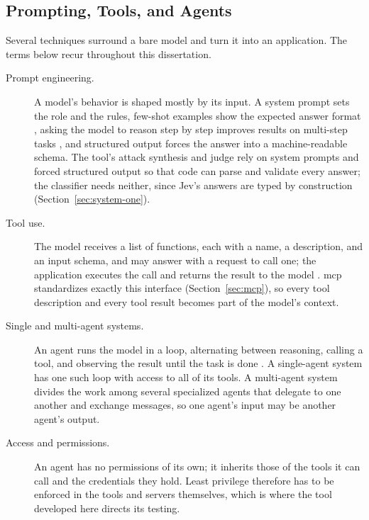 \subsection{Prompting, Tools, and Agents}
\label{sec:llm-ecosystem}

Several techniques surround a bare model and turn it into an application. The terms below recur throughout this dissertation.

\begin{description}
  \item[Prompt engineering.] A model's behavior is shaped mostly by its input. A system prompt sets the role and the rules, few-shot examples show the expected answer format \citep{brown2020language}, asking the model to reason step by step improves results on multi-step tasks \citep{wei2022cot}, and structured output forces the answer into a machine-readable schema. The tool's attack synthesis and judge rely on system prompts and forced structured output so that code can parse and validate every answer; the classifier needs neither, since Jev's answers are typed by construction (Section~\ref{sec:system-one}).

  \item[Tool use.] The model receives a list of functions, each with a name, a description, and an input schema, and may answer with a request to call one; the application executes the call and returns the result to the model \citep{schick2023toolformer}. \gls{mcp} standardizes exactly this interface (Section~\ref{sec:mcp}), so every tool description and every tool result becomes part of the model's context.

  \item[Single and multi-agent systems.] An agent runs the model in a loop, alternating between reasoning, calling a tool, and observing the result until the task is done \citep{yao2023react}. A single-agent system has one such loop with access to all of its tools. A multi-agent system divides the work among several specialized agents that delegate to one another and exchange messages, so one agent's input may be another agent's output.

  \item[Access and permissions.] An agent has no permissions of its own; it inherits those of the tools it can call and the credentials they hold. Least privilege therefore has to be enforced in the tools and servers themselves, which is where the tool developed here directs its testing.
\end{description}


